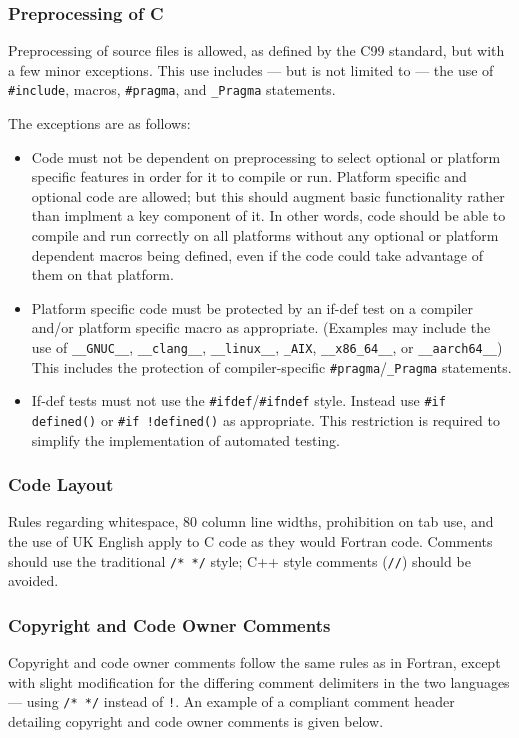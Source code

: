 \subsubsection{Preprocessing of C}
Preprocessing of source files is allowed, as defined by the C99 standard, but with a few minor exceptions.
This use includes --- but is not limited to --- the use of \verb|#include|, macros, \verb|#pragma|, and \verb|_Pragma| statements.

The exceptions are as follows:

\begin{itemize}

\item Code must not be dependent on preprocessing to select optional or platform specific features in order for it to compile or run.
      Platform specific and optional code are allowed; but this should augment basic functionality rather than implment a key component of it.
      In other words, code should be able to compile and run correctly on all platforms without any optional
      or platform dependent macros being defined, even if the code could take advantage of them on that platform.

\item Platform specific code must be protected by an if-def test on a compiler and/or platform specific macro as appropriate.
      (Examples may include the use of \verb|__GNUC__|, \verb|__clang__|, \verb|__linux__|, \verb|_AIX|, \verb|__x86_64__|, or \verb|__aarch64__|)
      This includes the protection of compiler-specific \verb|#pragma|/\verb|_Pragma| statements.

\item If-def tests must not use the \verb|#ifdef|/\verb|#ifndef| style. Instead use \verb|#if defined()| or  \verb|#if !defined()| as appropriate.
      This restriction is required to simplify the implementation of automated testing.

\end{itemize}

\subsubsection{Code Layout}
Rules regarding whitespace, 80 column line widths, prohibition on tab use, and the use of UK English apply to C code as they would Fortran code.
Comments should use the traditional \verb|/* */| style; C++ style comments (\verb|//|) should be avoided.

\subsubsection{Copyright and Code Owner Comments}
Copyright and code owner comments follow the same rules as in Fortran, except with slight modification for the differing comment delimiters in the two languages --- using \verb|/* */| instead of \verb|!|.
An example of a compliant comment header detailing copyright and code owner comments is given below.

